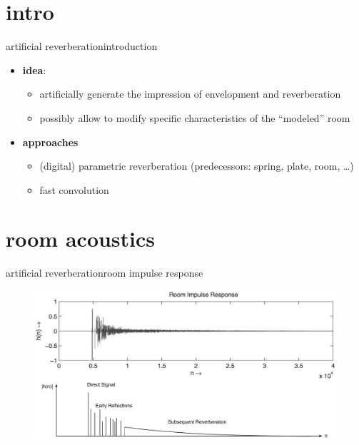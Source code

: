 


\subtitle{Part 20: Reverb}


	

\section{intro}
\begin{frame}{artificial reverberation}{introduction}
	\begin{itemize}
		\item	\textbf{idea}:\\
				\begin{itemize}
					\item	artificially generate the impression of envelopment and reverberation
					\item	possibly allow to modify specific characteristics of the ``modeled'' room
				\end{itemize}
		\pause
        \bigskip
		\item	\textbf{approaches}
			\begin{itemize}
				\item	(digital) parametric reverberation (predecessors: spring, plate, room, \ldots)
				\item	fast convolution
			\end{itemize}	
	\end{itemize}
\end{frame}

\section{room acoustics}
\begin{frame}{artificial reverberation}{room impulse response}
	\vspace{-3mm}\begin{figure}
		\centerline{\includegraphics[scale=.28]{graph/IR}}
	\end{figure}
\end{frame}

